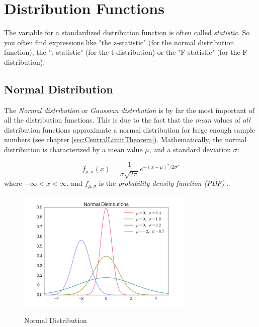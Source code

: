 \section{Distribution Functions}

The variable for a standardized distribution function is often called \emph{statistic}. So you often find expressions like "the z-statistic" (for the normal distribution function), the "t-statistic" (for the t-distribution) or the "F-statistic" (for the F-distribution).

\subsection{Normal Distribution} \label{sec:normalDistribution}

The \emph{Normal distribution} or \emph{Gaussian distribution} is by far the most important of all the distribution functions. This is due to the fact that the \emph{mean }values of \emph{all} distribution functions approximate a normal distribution for large enough sample numbers (see chapter \ref{sec:CentralLimitTheorem}).
Mathematically, the normal distribution is characterized by a mean value $\mu$, and a standard deviation $\sigma$:

\begin{equation}\label{eq_normal}
     f_{\mu,\sigma} (x) = \frac{1}{\sigma \sqrt{2 \pi}} e^{-( x - \mu )^2 /2 \sigma^2}
\end{equation}
where $ - \infty < x < \infty $, and $f_{\mu,\sigma}$ is the \emph{probability density function (PDF)} .

\begin{figure}
  \centering
  \includegraphics[width=0.75\textwidth]{../Images/Normal_Distribution_PDF.png}\\
  \caption{Normal Distribution}\label{fig:normal}
\end{figure}

